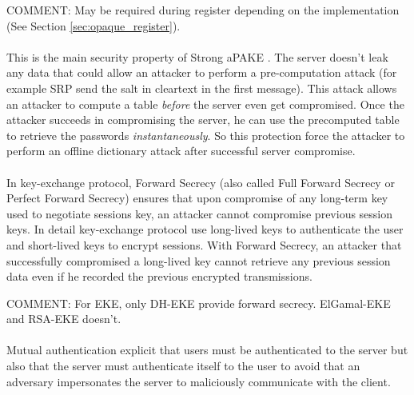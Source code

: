 \documentclass[../report.tex]{subfiles}
\begin{document}
COMMENT: May be required during register depending on the implementation (See Section \ref{sec:opaque_register}).

\paragraph{}
This is the main security property of Strong aPAKE \cite{OPAQUE_Paper}. The server doesn't leak any data that could allow an attacker to perform a pre-computation attack (for example SRP send the salt in cleartext in the first message). This attack allows an attacker to compute a table \emph{before} the server even get compromised. Once the attacker succeeds in compromising the server, he can use the precomputed table to retrieve the passwords \emph{instantaneously}. So this protection force the attacker to perform an offline dictionary attack after successful server compromise. %



\paragraph{}
In key-exchange protocol, Forward Secrecy (also called Full Forward Secrecy or Perfect Forward Secrecy) ensures that upon compromise of any long-term key used to negotiate sessions key, an attacker cannot compromise previous session keys.
In detail key-exchange protocol use long-lived keys to authenticate the user and short-lived keys to encrypt sessions. With Forward Secrecy, an attacker that successfully compromised a long-lived key cannot retrieve any previous session data even if he recorded the previous encrypted transmissions. %

COMMENT: For EKE, only DH-EKE provide forward secrecy. ElGamal-EKE and RSA-EKE doesn't.

\paragraph{}
Mutual authentication explicit that users must be authenticated to the server but also that the server must authenticate itself to the user to avoid that an adversary impersonates the server to maliciously communicate with the client.
\end{document}
